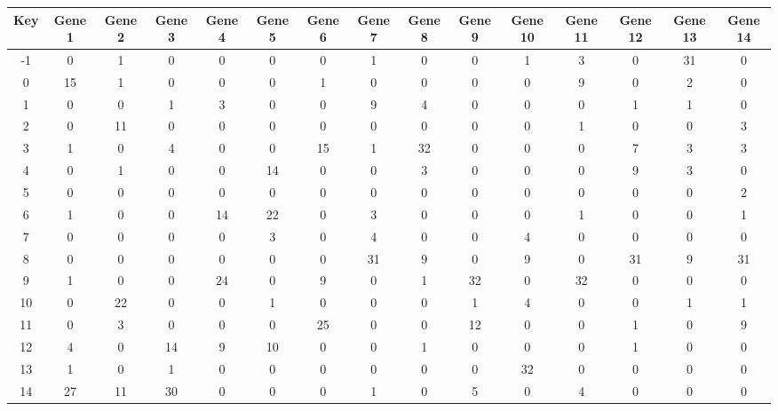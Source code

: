 \begin{tabular}{|c|c|c|c|c|c|c|c|c|c|c|c|c|c|c|}
\hline
Key & Gene 1 & Gene 2 & Gene 3 & Gene 4 & Gene 5 & Gene 6 & Gene 7 & Gene 8 & Gene 9 & Gene 10 & Gene 11 & Gene 12 & Gene 13 & Gene 14 \\
\hline
-1 & 0 & 1 & 0 & 0 & 0 & 0 & 1 & 0 & 0 & 1 & 3 & 0 & 31 & 0 \\
0 & 15 & 1 & 0 & 0 & 0 & 1 & 0 & 0 & 0 & 0 & 9 & 0 & 2 & 0 \\
1 & 0 & 0 & 1 & 3 & 0 & 0 & 9 & 4 & 0 & 0 & 0 & 1 & 1 & 0 \\
2 & 0 & 11 & 0 & 0 & 0 & 0 & 0 & 0 & 0 & 0 & 1 & 0 & 0 & 3 \\
3 & 1 & 0 & 4 & 0 & 0 & 15 & 1 & 32 & 0 & 0 & 0 & 7 & 3 & 3 \\
4 & 0 & 1 & 0 & 0 & 14 & 0 & 0 & 3 & 0 & 0 & 0 & 9 & 3 & 0 \\
5 & 0 & 0 & 0 & 0 & 0 & 0 & 0 & 0 & 0 & 0 & 0 & 0 & 0 & 2 \\
6 & 1 & 0 & 0 & 14 & 22 & 0 & 3 & 0 & 0 & 0 & 1 & 0 & 0 & 1 \\
7 & 0 & 0 & 0 & 0 & 3 & 0 & 4 & 0 & 0 & 4 & 0 & 0 & 0 & 0 \\
8 & 0 & 0 & 0 & 0 & 0 & 0 & 31 & 9 & 0 & 9 & 0 & 31 & 9 & 31 \\
9 & 1 & 0 & 0 & 24 & 0 & 9 & 0 & 1 & 32 & 0 & 32 & 0 & 0 & 0 \\
10 & 0 & 22 & 0 & 0 & 1 & 0 & 0 & 0 & 1 & 4 & 0 & 0 & 1 & 1 \\
11 & 0 & 3 & 0 & 0 & 0 & 25 & 0 & 0 & 12 & 0 & 0 & 1 & 0 & 9 \\
12 & 4 & 0 & 14 & 9 & 10 & 0 & 0 & 1 & 0 & 0 & 0 & 1 & 0 & 0 \\
13 & 1 & 0 & 1 & 0 & 0 & 0 & 0 & 0 & 0 & 32 & 0 & 0 & 0 & 0 \\
14 & 27 & 11 & 30 & 0 & 0 & 0 & 1 & 0 & 5 & 0 & 4 & 0 & 0 & 0 \\
\hline
\end{tabular}